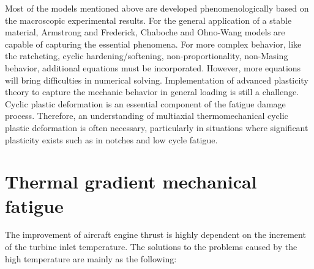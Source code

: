 Most of the models mentioned above are developed phenomenologically based on the macroscopic experimental results.
For the general application of a stable material, Armstrong and Frederick, Chaboche and Ohno-Wang models are capable of capturing the essential phenomena.
For more complex behavior, like the ratcheting, cyclic hardening/softening, non-proportionality, non-Masing behavior, additional equations must be incorporated.
However, more equations will bring difficulties in numerical solving.
Implementation of advanced plasticity theory to capture the mechanic behavior in general loading is still a challenge.
Cyclic plastic deformation is an essential component of the fatigue damage process.
Therefore, an understanding of multiaxial thermomechanical cyclic plastic deformation is often necessary, particularly in situations where significant plasticity exists such as in notches and low cycle fatigue.


\section{Thermal gradient mechanical fatigue}
\noindent
The improvement of aircraft engine thrust is highly dependent on the increment of the turbine inlet temperature.
The solutions to the problems caused by the high temperature are mainly as the following:

